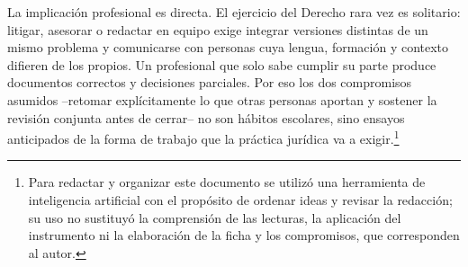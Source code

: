 \documentclass[
  spanish,
  letterpaper, oneside
]{article}
\begin{document}
La implicación profesional es directa. El ejercicio del Derecho rara vez es
solitario: litigar, asesorar o redactar en equipo exige integrar versiones distintas
de un mismo problema y comunicarse con personas cuya lengua, formación y contexto
difieren de los propios. Un profesional que solo sabe cumplir su parte produce
documentos correctos y decisiones parciales. Por eso los dos compromisos asumidos
--retomar explícitamente lo que otras personas aportan y sostener la revisión
conjunta antes de cerrar-- no son hábitos escolares, sino ensayos anticipados de la
forma de trabajo que la práctica jurídica va a exigir.\footnote{Para redactar y
organizar este documento se utilizó una herramienta de inteligencia artificial con el
propósito de ordenar ideas y revisar la redacción; su uso no sustituyó la comprensión
de las lecturas, la aplicación del instrumento ni la elaboración de la ficha y los
compromisos, que corresponden al autor.}

\clearpage
\nocite{bautista2016didactica,borges2007estudiante,zambranoPilay2020tecnologias,aguadoSleeter2021educacion,conocer2025ec0554,bertely2011interaprendizajes}

\end{document}
